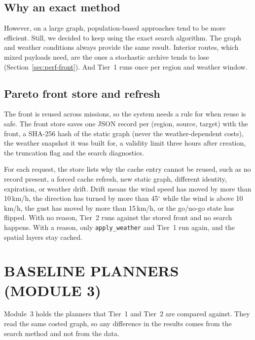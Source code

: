 \subsection{Why an exact method}

However, on a large graph, population-based approaches tend to be more efficient. Still,
we decided to keep using the exact search algorithm. The graph and weather conditions
always provide the same result. Interior routes, which
mixed payloads need, are the ones a stochastic archive tends to lose
(Section~\ref{sec:perf-front}). And Tier~1 runs once per region and weather window.

\subsection{Pareto front store and refresh}

The front is reused across missions, so the system needs a rule for when reuse is safe.
The front store saves one JSON record per (region, source, target) with the front, a
SHA-256 hash of the static graph (never the weather-dependent costs), the weather
snapshot it was built for, a validity limit three hours after creation, the truncation
flag and the search diagnostics.

For each request, the store lists why the cache entry cannot be reused, such as no record present, a forced cache refresh, new static graph, different
identity, expiration, or weather drift. Drift means the wind speed has moved by
more than 10\,km/h, the direction has turned by more than 45$^\circ$ while the wind is
above 10\,km/h, the gust has moved by more than 15\,km/h, or the go/no-go state has
flipped. With no reason, Tier~2 runs against the stored front and no search happens.
With a reason, only \texttt{apply\_weather} and Tier~1 run again, and the spatial layers
stay cached.

\section{BASELINE PLANNERS (MODULE 3)}\label{sec:m3}

Module~3 holds the planners that Tier~1 and Tier~2 are compared against. They read the
same costed graph, so any difference in the results comes from the search method and
not from the data.

